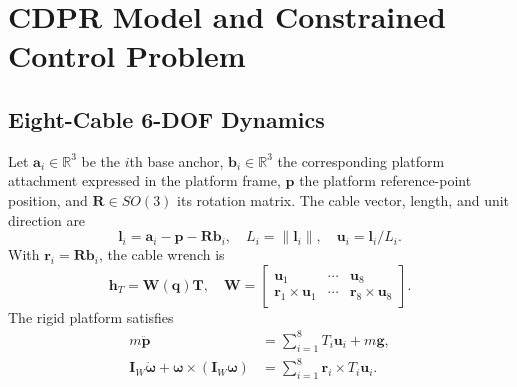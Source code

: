 \documentclass[conference]{IEEEtran}
\begin{document}
\section{CDPR Model and Constrained Control Problem}
\subsection{Eight-Cable 6-DOF Dynamics}
Let $\mathbf a_i\in\mathbb R^3$ be the $i$th base anchor, $\mathbf b_i\in\mathbb R^3$ the corresponding platform attachment expressed in the platform frame, $\mathbf p$ the platform reference-point position, and $\mathbf R\in SO(3)$ its rotation matrix. The cable vector, length, and unit direction are
\begin{equation}
\mathbf l_i=\mathbf a_i-\mathbf p-\mathbf R\mathbf b_i,\quad
L_i=\|\mathbf l_i\|,\quad \mathbf u_i=\mathbf l_i/L_i .
\end{equation}
With $\mathbf r_i=\mathbf R\mathbf b_i$, the cable wrench is
\begin{equation}
\mathbf h_T=\mathbf W(\mathbf q)\mathbf T,\quad
\mathbf W=
\begin{bmatrix}
\mathbf u_1&\cdots&\mathbf u_8\\
\mathbf r_1\times\mathbf u_1&\cdots&\mathbf r_8\times\mathbf u_8
\end{bmatrix}.
\end{equation}
The rigid platform satisfies
\begin{align}
m\ddot{\mathbf p}&=\sum_{i=1}^{8}T_i\mathbf u_i+m\mathbf g,\\
\mathbf I_W\dot{\boldsymbol\omega}+\boldsymbol\omega\times(\mathbf I_W\boldsymbol\omega)
&=\sum_{i=1}^{8}\mathbf r_i\times T_i\mathbf u_i .
\end{align}
\end{document}
